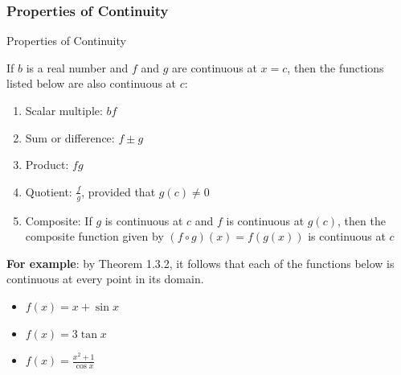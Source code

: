 \documentclass[12pt]{article}
\theoremstyle{beautifulthm}
\begin{document}
\subsubsection{Properties of Continuity}
\begin{mytheorem}{Properties of Continuity}{}

If $b$ is a real number and $f$ and $g$ are continuous at $x = c$, then the functions listed below are also continuous at $c$:
\begin{enumerate}
    \item Scalar multiple: $bf$
    \item Sum or difference: $f \pm g$
    \item Product: $fg$
    \item Quotient: $\frac{f}{g}$, provided that $g(c) \neq 0$
    \item Composite: If \( g \) is continuous at \( c \) and \( f \) is continuous at \( g(c) \), then the composite function given by \( (f \circ g)(x) = f(g(x)) \) is continuous at \( c \)
\end{enumerate}
\end{mytheorem}
\textbf{For example}: by Theorem 1.3.2, it follows that each of the functions below is continuous at every point in its domain.
\begin{itemize}
  \item $f(x) = x + \sin x$
  \item $f(x) = 3 \tan x$
  \item $f(x) = \frac{x^2 + 1}{\cos x}$
\end{itemize}

\newpage
\end{document}
